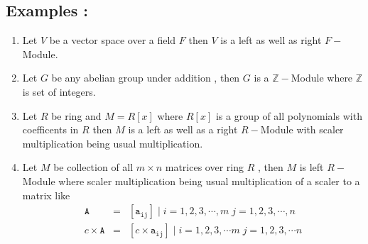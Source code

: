 \subsection{Examples :}
\begin{enumerate}
\item Let $V$ be a vector space over a field $F$ then $V$ is a left as well as right $F-$Module.\newline \bigskip
\item Let $G$ be any abelian group under addition , then $G$ is a $\mathbb{Z-}$Module where $\mathbb{Z}$ is set of integers.\newline \bigskip
\item Let $R$ be ring and $M= R[x]$  where $R[x]$ is a group of all polynomials with coefficents in $R$ then $M$ is a left as well as a right $R-$Module with scaler multiplication being usual multiplication.\newline \bigskip
\item Let $M$ be collection of all $m \times n $ matrices over ring $R$ , then $M$ is left $R-$Module where scaler multiplication being usual multiplication of a scaler to a matrix like \newline \bigskip
	\begin{eqnarray*}
\mathtt{A} &=& {[\mathtt{a_{ij}}] \; \vert \; i = 1,2,3,\cdots, m  \; j=1,2,3,\cdots, n} \\ c\times \mathtt{A} &=& {[c \times \mathtt{a_{ij}}] \; \vert \; i = 1,2,3,\cdots m  \; j=1,2,3,\cdots n }
	\end{eqnarray*}
\end{enumerate}
